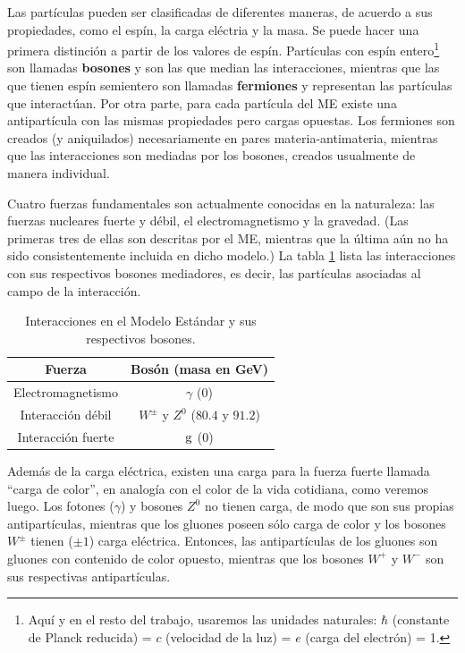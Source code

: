 \documentclass[a4paper,12pt]{article}
\begin{document}
Las partículas pueden ser clasificadas de diferentes maneras, de acuerdo a sus propiedades, como el espín, la carga eléctria y la masa. Se puede hacer una primera distinción a partir de los valores de espín. Partículas con espín entero\footnote{Aquí y en el resto del trabajo, usaremos las unidades naturales: $\hbar$ (constante de Planck reducida) = $c$ (velocidad de la luz) = $e$ (carga del electrón) = 1.} son llamadas \textbf{bosones} y son las que median las interacciones, mientras que las que tienen espín semientero son llamadas \textbf{fermiones} y representan las partículas que interactúan. Por otra parte, para cada partícula del ME existe una antipartícula con las mismas propiedades pero cargas opuestas. Los fermiones son creados (y aniquilados) necesariamente en pares materia-antimateria, mientras que las interacciones son mediadas por los bosones, creados usualmente de manera individual.

Cuatro fuerzas fundamentales son actualmente conocidas en la naturaleza: las fuerzas nucleares fuerte y débil, el electromagnetismo y la gravedad. (Las primeras tres de ellas son descritas por el ME, mientras que la última aún no ha sido consistentemente incluida en dicho modelo.) La tabla \ref{table:SMBoson} lista las interacciones con sus respectivos bosones mediadores, es decir, las partículas asociadas al campo de la interacción.

\begin{table}[!h]
\caption{Interacciones en el Modelo Estándar y sus respectivos bosones.}\smallskip
\label{table:SMBoson}
\centering 

\begin{tabular}{cc}
\hline \hline  
\smallskip
Fuerza& Bosón (masa en GeV\cite{Beringer:1900zz}) \\ 
\hline
Electromagnetismo & $\gamma$ (0) \\
Interacción débil & $W^\pm$ y $Z^0$ ($80.4$ y $91.2$) \\
Interacción fuerte & ${\mathrm g}$ (0) \\
\end{tabular}
\end{table}


Además de la carga eléctrica, existen una carga para la fuerza fuerte llamada ``carga de color'', en analogía con el color de la vida cotidiana, como veremos luego. Los fotones ($\gamma$) y bosones $Z^0$ no tienen carga, de modo que son sus propias antipartículas, mientras que los gluones poseen sólo carga de color y los bosones $W^\pm$ tienen ($\pm 1$) carga eléctrica. Entonces, las antipartículas de los gluones son gluones con contenido de color opuesto, mientras que los bosones $W^+$ y $W^-$ son sus respectivas antipartículas.
\end{document}
